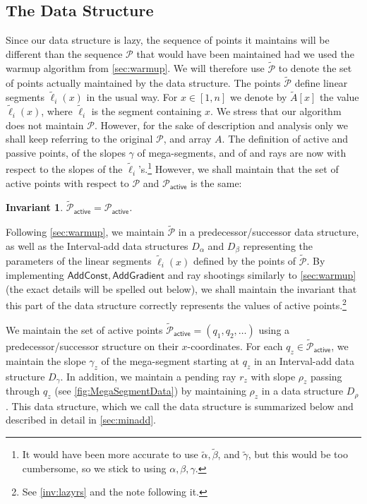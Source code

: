 \documentclass[a4paper,UKenglish,cleveref, autoref, thm-restate]{lipics-v2021}
\newcommand{\AC}{\mathsf{AddConst}}
\newcommand{\AG}{\mathsf{AddGradient}}
\newcommand{\local}{\text{short }}
\newcommand{\longrange}{\text{long }}
\newcommand{\addmin}{\text{Add-min }}
\renewcommand{\P}{\mathcal{P}}
\newcommand{\AP}{\P_{\mathsf{active}}}
\newcommand{\TAP}{\tilde{\P}_{\mathsf{active}}}
\newcommand{\TA}{\tilde{A}}
\newcommand{\tell}{\tilde{\ell}}
\newcommand{\TP}{\tilde{\P}}
\newcommand{\ray}{r}
\newcommand{\rl}[1]{\rho_{#1}}
\newtheorem{invariant}{Invariant}
\begin{document}
\subsection{The Data Structure}
Since our data structure is lazy, the sequence of points it maintains will be different than the sequence $\P$ that would have been maintained had we used the warmup algorithm from \cref{sec:warmup}. We will therefore use $\TP$ to denote the set of points actually maintained by the data structure. The points $\TP$ define linear segments $\tell_i(x)$ in the usual way. For $x \in [1,n]$ we denote by $\TA[x]$ the value $\tell_i(x)$, where $\tell_i$ is the segment containing $x$.
We stress that our algorithm does not maintain $\P$. However, for the sake of description and analysis only we shall keep referring to the original $\P$, and array $A$.
The definition of active and passive points, of the slopes $\gamma$ of mega-segments, and of \local and \longrange rays are now with respect to the slopes of the $\tell_i$'s.\footnote{It would have been more accurate to use $\tilde \alpha, \tilde \beta$, and $\tilde \gamma$, but this would be too cumbersome, so we stick to using $\alpha, \beta, \gamma$.} 
However, we shall maintain that the set of active points with respect to $\P$ and $\AP$ is the same:
\begin{invariant}\label{inv:TAP-AP}
$\TAP = \AP$.	
\end{invariant}

Following \cref{sec:warmup}, we maintain $\TP$ in a predecessor/successor data structure, as well as the Interval-add data structures $D_\alpha$ and $D_\beta$ representing the parameters of the linear segments $\tell_i(x)$ defined by the points of $\TP$. 
By implementing $\AC, \AG$ and \longrange ray shootings similarly to \cref{sec:warmup} (the exact details will be spelled out below),  we shall maintain the invariant that this part of the data structure correctly represents the values of active points.\footnote{See  \cref{inv:lazyrs} and the note following it.}  

We maintain the set of active points $\TAP=(q_1, q_2, \ldots)$ using a predecessor/successor structure on their $x$-coordinates. 
For each $q_z \in \TAP$, we maintain the slope $\gamma_z$ of the mega-segment starting at $q_z$ in an Interval-add data structure $D_\gamma$. In addition, we maintain a pending \local ray $\ray_z$ with slope $\rl{z}$ passing through $q_z$ (see \cref{fig:MegaSegmentData}) by maintaining $\rl{z}$ in a data structure $D_\rho$. This data structure, which we call the \addmin data structure is summarized below and described in detail in \cref{sec:minadd}. 
\end{document}
